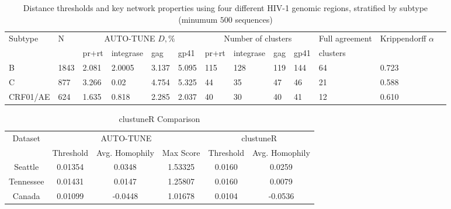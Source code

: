 \documentclass[utf8]{FrontiersinHarvard} %
\begin{document}
\begin{table}[h!]
	\caption{Distance thresholds and key network properties using four different HIV-1 genomic regions, stratified by subtype (minumum $500$ sequences)}
  \label{tab:LANL:full}

	\vspace{10pt}
	\centering
	\begin{ssmall}
		\begin{tabular}{lllllllllllll}
			\hline
			Subtype  & N    & \multicolumn{4}{c}{AUTO-TUNE $D, \%$} & \multicolumn{4}{c}{Number of clusters} & Full agreement & Krippendorff $\alpha$                                                     \\
			         &      & pr+rt                                 & integrase                              & gag            & gp41                  & pr+rt & integrase & gag & gp41 & clusters &       \\
			\hline

			B        & 1843 & 2.081                                 & 2.0005                                 & 3.137          & 5.095                 & 115   & 128       & 119 & 144  & 64       & 0.723
			\\ C & 877 & 3.266 & 0.02 & 4.754 & 5.325 & 44 & 35 & 47 & 46 & 21 & 0.588 \\
			CRF01/AE & 624  & 1.635                                 & 0.818                                  & 2.285          & 2.037                 & 40    & 30        & 40  & 41   & 12       & 0.610
			\\

			\hline
		\end{tabular}
	\end{ssmall}
\end{table}

\begin{table}[h!]
	\caption{clustuneR Comparison}
	\label{tab:homophily}
	\vspace{8pt}
	\centering
	\begin{tabular}{|c|c|c|c|c|c|}
		\hline
		Dataset   & \multicolumn{3}{c|}{AUTO-TUNE} & \multicolumn{2}{c|}{clustuneR}                                          \\
		\cline{2-6}
		          & Threshold                      & Avg. Homophily                 & Max Score & Threshold & Avg. Homophily \\
		\hline
		Seattle   & 0.01354                        & 0.0348                         & 1.53325   & 0.0160    & 0.0259         \\
		Tennessee & 0.01431                        & 0.0147                         & 1.25807   & 0.0160    & 0.0079         \\
		Canada    & 0.01099                        & -0.0448                        & 1.01678   & 0.0104    & -0.0536        \\
		\hline
	\end{tabular}
\end{table}
\end{document}
